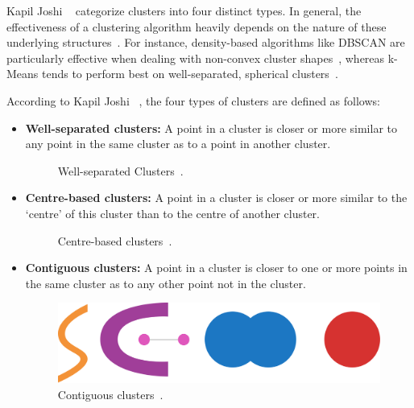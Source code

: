 \documentclass[10pt,twocolumn,letterpaper]{article}
\begin{document}
Kapil Joshi \etal~\cite{Joshi2015} categorize clusters into four distinct
types. In general, the effectiveness of a clustering algorithm heavily depends
on the nature of these underlying structures~\cite{Ezugwu2022104743}. For
instance, density-based algorithms like DBSCAN are particularly effective when
dealing with non-convex cluster shapes~\cite{Bhargav2016}, whereas k-Means
tends to perform best on well-separated, spherical clusters~\cite{Jain2010651}.

According to Kapil Joshi \etal~\cite{Joshi2015}, the four types of clusters are
defined as follows:
\begin{itemize}
    \item\textbf{Well-separated clusters:} A point in a cluster is closer or more similar to any point in the same cluster
          as to a point in another cluster.
          \begin{figure}[h]
              \centering
              \caption{Well-separated Clusters~\cite{Joshi2015}.}
              \label{fig:well-separated-circles}
          \end{figure}

    \item\textbf{Centre-based clusters:} A point in a cluster is closer or more similar to the ‘centre’ of this cluster
          than to the centre of another cluster.
          \begin{figure}[h]
              \centering
              \caption{Centre-based clusters~\cite{Joshi2015}.}
              \label{fig:well-separated}
          \end{figure}

    \item\textbf{Contiguous clusters:} A point in a cluster is closer to one or more points in the same cluster as to
          any other point not in the cluster.
          \begin{figure}[h]
              \centering
              \includegraphics[width=0.5\linewidth]{figures/Contigous clusters}
              \caption{Contiguous clusters~\cite{Joshi2015}.}
              \label{fig:Contiguous-clusters}
          \end{figure}


\end{itemize}
\end{document}

